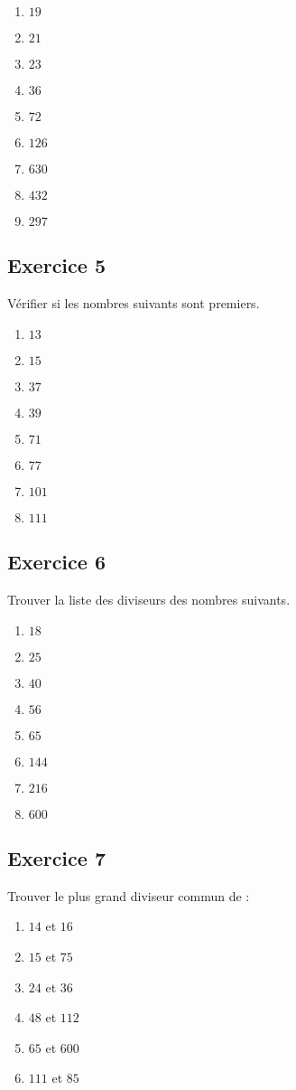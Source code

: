 \documentclass[12 pt]{extarticle}
\theoremstyle{plain}
\begin{document}
\begin{enumerate}
\item $19$
\item $21$
\item $23$
\item $36$
\item $72$
\item $126$
\item $630$
\item $432$
\item $297$
\end{enumerate}
\subsection*{Exercice 5}
Vérifier si les nombres suivants sont premiers.
\begin{enumerate}
\item  $13$
\item $15$ 
\item $37$
\item $39$
\item $71$ 
\item $77$
\item $101$ 
\item $111$ 
\end{enumerate}

\subsection*{Exercice 6}

Trouver la liste des diviseurs des nombres suivants. 

\begin{enumerate}
\item $18$
\item $25$ 
\item $40$ 
\item $56$
\item $65$
\item $144$
\item $216$
\item $600$

\end{enumerate}

\subsection*{Exercice 7}

Trouver le plus grand diviseur commun de : 

\begin{enumerate}
\item $14$ et $16$ 
\item $15$ et $75$
\item $24$ et $36$
\item $48$ et $112$
\item $65$ et $600$
\item $111$ et $85$
\end{enumerate}


 	
\end{document}
